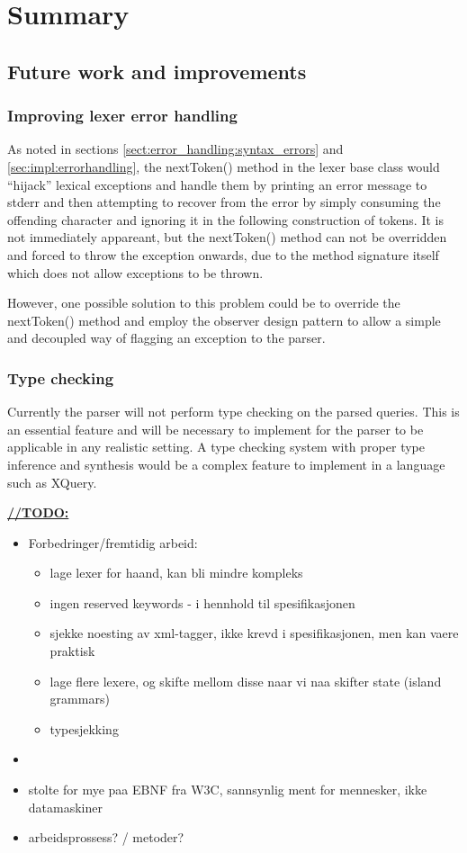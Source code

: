 \chapter{Summary}

\section{Future work and improvements}
\subsection{Improving lexer error handling}
As noted in sections \ref{sect:error_handling:syntax_errors} and
\ref{sec:impl:errorhandling}, the nextToken() method in the lexer base class
would ``hijack'' lexical exceptions and handle them by printing an error message
to stderr and then attempting to recover from the error by simply consuming the
offending character and ignoring it in the following construction of tokens. It is 
not immediately appareant, but the nextToken() method can not be overridden and
forced to throw the exception onwards, due to the method signature itself which
does not allow exceptions to be thrown. 

However, one possible solution to this problem could be to override the
nextToken() method and employ the observer design
pattern to allow a
simple and decoupled way of flagging an exception to the parser.

\subsection{Type checking}
Currently the parser will not perform type checking on the parsed queries. This
is an essential feature and will be necessary to implement for the parser to be
applicable in any realistic setting. A type checking system with proper type
inference and synthesis would be a complex feature to implement in a language
such as XQuery. 

\label{sect:summary:future_work}
\underline{\textbf{\LARGE //TODO:}}
\begin{itemize}
	\item Forbedringer/fremtidig arbeid:
	
	\begin{itemize}
		\item lage lexer for haand, kan bli mindre kompleks
		\item ingen reserved keywords - i hennhold til spesifikasjonen
		\item sjekke noesting av xml-tagger, ikke krevd i spesifikasjonen, men kan vaere praktisk
		\item lage flere lexere, og skifte mellom disse naar vi naa skifter state
		(island grammars)
		\item typesjekking
	\end{itemize}
	
	\item \item stolte for mye paa EBNF fra W3C, sannsynlig ment for mennesker, ikke datamaskiner
	\item arbeidsprossess? / metoder?
\end{itemize}


